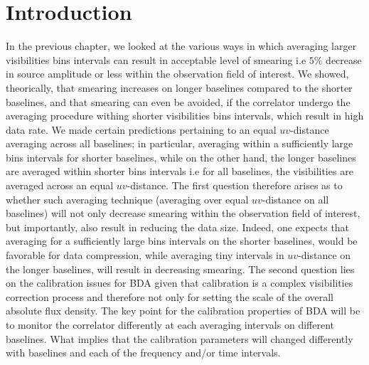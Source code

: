 \documentclass[useAMS,usenatbib]{mn2e}
\begin{document}
\section[]{Introduction}
\newcommand{\VV}{\mathcal{V}}
\newcommand{\PP}{\mathcal{P}}
\newcommand{\VVM}{\mathcal{V}^\mathrm{M}}
\newcommand{\WW}{\mathcal{W}}
\newcommand{\II}{\mathcal{I}}
\newcommand{\IID}{\mathcal{I}^\mathrm{D}}
\newcommand{\IIDI}{\mathcal{I}^\mathrm{DI}}
\newcommand{\EE}{\mathcal{E}}
\newcommand{\FF}{\mathcal{F}}
\newcommand{\HH}{\mathcal{H}}
\newcommand{\TT}{\mathcal{T}}
\newcommand{\NN}{\mathcal{N}}
\newcommand{\uu}{\bmath{u}}
\newcommand{\Btf}{\mathsf{B}^{[\Delta t\Delta\nu]}}
\newcommand{\Babtf}{\mathsf{B}^{[\alpha\Delta t,\beta\Delta\nu]}}
\newcommand{\Bab}{\mathsf{B}^{[\alpha\beta]}}
\newcommand{\Buv}{\mathsf{B}^{[uv]}}
\newcommand{\Bij}{\mathsf{B}}
\newcommand{\Ptf}{\Pi^{[t\nu]}}
\newcommand{\Puv}{\Pi^{[uv]}}
\newcommand{\Vm}{V^\mathrm{M}}
\newcommand{\Vs}{V^\mathrm{S}}
\newcommand{\BIN}[2]{#1s$\times$#2MHz}
\newcommand{\Bda}{\mathsf{B}^{[\Delta_{pq} t, \Delta_{pq} \nu]}}
\newcommand{\Dbda}{\mathsf{D}^{[\Delta_{pq} t, \Delta_{pq} \nu]}}
\newcommand{\Dbdaph}{\mathsf{D}^{[\Delta_{\alpha \beta} t, \Delta_{\alpha \beta} \nu]}}
\newcommand{\WF}[3]{{#1}-$#2${}$\times${}$#3$} 
In the previous chapter, we looked at the various  ways in which averaging larger visibilities bins intervals 
can result in acceptable level of smearing i.e $5\%$ decrease in source amplitude or less within the observation field of interest. We showed, theorically, that
smearing increases on longer baselines compared to the shorter baselines, and that smearing can even be avoided, if 
the correlator undergo the averaging procedure withing shorter visibilities bins intervals, which result in high
data rate. We made certain predictions pertaining to an equal $uv$-distance averaging across all baselines; in particular, averaging 
within a sufficiently large bins intervals for shorter baselines, while on the other hand, the longer baselines are 
averaged within shorter bins intervals i.e for all baselines, the visibilities are averaged 
across an equal  $uv$-distance.
The first  question therefore arises as to whether such averaging technique (averaging over equal $uv$-distance on all baselines)
will not only decrease smearing within the observation field of interest, but importantly, also result in reducing the data size. 
Indeed, one expects that averaging for a sufficiently large bins intervals on the shorter baselines,
would be favorable for data compression,
while averaging tiny  intervals in $uv$-distance on the longer baselines, will result in decreasing smearing.
The second question lies on the calibration issues for BDA given that calibration
is a complex visibilities correction process and therefore not only for setting the scale of the overall absolute flux density.
The key point for the calibration properties of BDA  will be to monitor the correlator differently 
at each averaging intervals on different baselines. What implies that the calibration parameters will 
changed differently with baselines and  each of the frequency and/or time intervals.
\end{document}
